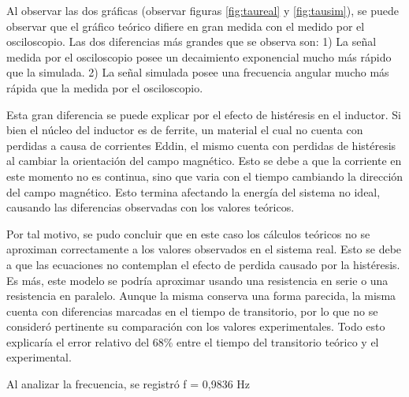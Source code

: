 \documentclass{article}
\begin{document}
   
  Al observar las dos gráficas (observar figuras \ref{fig:taureal} y \ref{fig:tausim}), se puede observar que el gráfico teórico difiere en gran medida con el medido por el osciloscopio. Las dos diferencias más grandes que se observa son: 1) La señal medida por el osciloscopio posee un decaimiento exponencial mucho más rápido que la simulada. 2) La señal simulada posee una frecuencia angular mucho más rápida que la medida por el osciloscopio. \par 
  Esta gran diferencia se puede explicar por el efecto de histéresis en el inductor. Si bien el núcleo del inductor es de ferrite, un material el cual no cuenta con perdidas a causa de corrientes Eddin, el mismo cuenta con perdidas de histéresis al cambiar la orientación del campo magnético. Esto se debe a que la corriente en este momento no es continua, sino que varia con el tiempo cambiando la dirección del campo magnético. Esto termina afectando la energía del sistema no ideal, causando las diferencias observadas con los valores teóricos.\par
  Por tal motivo, se pudo concluir que en este caso los cálculos teóricos no se aproximan correctamente a los valores observados en el sistema real. Esto se debe a que las ecuaciones no contemplan el efecto de perdida causado por la histéresis. Es más, este modelo se podría aproximar usando una resistencia en serie o una resistencia en paralelo. Aunque la misma conserva una forma parecida, la misma cuenta con diferencias marcadas en el tiempo de transitorio, por lo que no se consideró pertinente su comparación con los valores experimentales. Todo esto explicaría el error relativo del 68\% entre el tiempo del transitorio teórico y el experimental.\par
  Al analizar la frecuencia, se registró f = 0,9836 Hz\par
  
\end{document}
